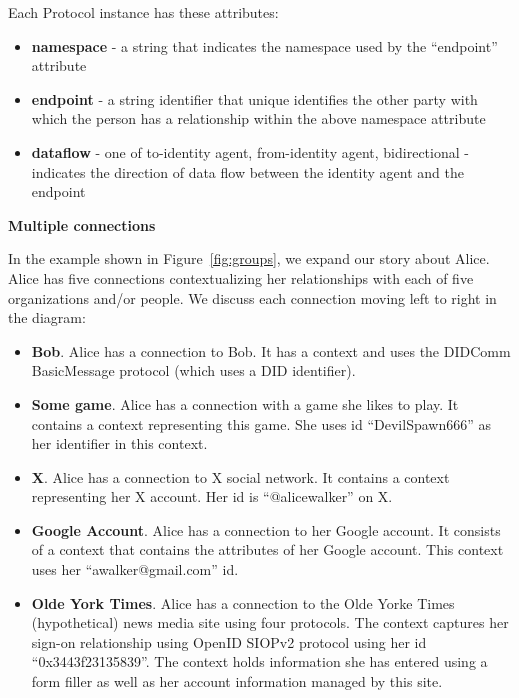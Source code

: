 \documentclass[11pt, oneside]{article}   	%
\begin{document}
Each Protocol instance has these attributes:
\begin{itemize}
\item \textbf{namespace} - a string that indicates the namespace used by the ``endpoint'' attribute
\item \textbf{endpoint} - a string identifier that unique identifies the other party with which the person has a relationship within the above namespace attribute
\item \textbf{dataflow} - one of {to-identity agent, from-identity agent, bidirectional} - indicates the direction of data flow between the identity agent and the endpoint
\end{itemize}

\textbf{Multiple connections}

In the example shown in Figure~\ref{fig:groups}, we expand our story about Alice. Alice has five connections contextualizing her relationships with each of five organizations and/or people. We discuss each connection moving left to right in the diagram:

\begin{itemize}
	\item \textbf{Bob}. Alice has a connection to Bob. It has a   context and uses the DIDComm BasicMessage protocol (which uses a DID identifier).
	\item \textbf{Some game}. Alice has a connection with a game she likes to play. It contains a context representing this game. She uses id ``DevilSpawn666'' as her identifier in this context.  
	\item \textbf{X}. Alice has a connection to X social network. It contains a context representing her X account. Her id is ``@alicewalker'' on X.
	\item \textbf{Google Account}. Alice has a connection to her Google account. It consists of a context that contains the attributes of her Google account. This context uses her ``awalker@gmail.com'' id. 
	\item \textbf{Olde York Times}. Alice has a connection to the Olde Yorke Times (hypothetical) news media site using four protocols. The context captures her sign-on relationship using OpenID SIOPv2 protocol using her id ``0x3443f23135839''. The context holds information she has entered using a form filler as well as her account information managed by this site. 
\end{itemize}
\end{document}
